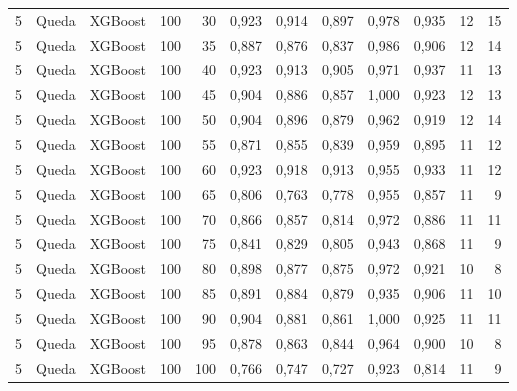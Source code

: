 \begin{longtable}{@{}rllrrrrrrrrr@{}}
5 & Queda & XGBoost & 100 & 30 & 0,923 & 0,914 & 0,897 & 0,978 & 0,935 & 12 & 15 \\
5 & Queda & XGBoost & 100 & 35 & 0,887 & 0,876 & 0,837 & 0,986 & 0,906 & 12 & 14 \\
5 & Queda & XGBoost & 100 & 40 & 0,923 & 0,913 & 0,905 & 0,971 & 0,937 & 11 & 13 \\
5 & Queda & XGBoost & 100 & 45 & 0,904 & 0,886 & 0,857 & 1,000 & 0,923 & 12 & 13 \\
5 & Queda & XGBoost & 100 & 50 & 0,904 & 0,896 & 0,879 & 0,962 & 0,919 & 12 & 14 \\
5 & Queda & XGBoost & 100 & 55 & 0,871 & 0,855 & 0,839 & 0,959 & 0,895 & 11 & 12 \\
5 & Queda & XGBoost & 100 & 60 & 0,923 & 0,918 & 0,913 & 0,955 & 0,933 & 11 & 12 \\
5 & Queda & XGBoost & 100 & 65 & 0,806 & 0,763 & 0,778 & 0,955 & 0,857 & 11 & 9 \\
5 & Queda & XGBoost & 100 & 70 & 0,866 & 0,857 & 0,814 & 0,972 & 0,886 & 11 & 11 \\
5 & Queda & XGBoost & 100 & 75 & 0,841 & 0,829 & 0,805 & 0,943 & 0,868 & 11 & 9 \\
5 & Queda & XGBoost & 100 & 80 & 0,898 & 0,877 & 0,875 & 0,972 & 0,921 & 10 & 8 \\
5 & Queda & XGBoost & 100 & 85 & 0,891 & 0,884 & 0,879 & 0,935 & 0,906 & 11 & 10 \\
5 & Queda & XGBoost & 100 & 90 & 0,904 & 0,881 & 0,861 & 1,000 & 0,925 & 11 & 11 \\
5 & Queda & XGBoost & 100 & 95 & 0,878 & 0,863 & 0,844 & 0,964 & 0,900 & 10 & 8 \\
5 & Queda & XGBoost & 100 & 100 & 0,766 & 0,747 & 0,727 & 0,923 & 0,814 & 11 & 9 \\
\end{longtable}

